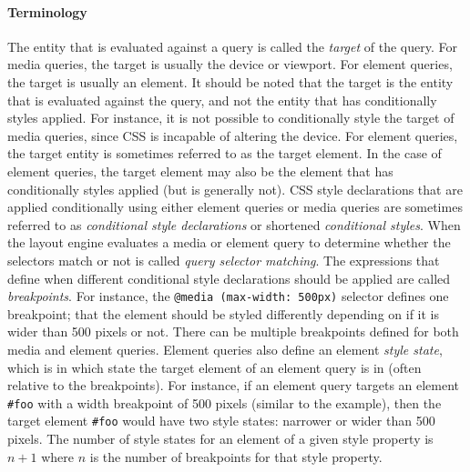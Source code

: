 \documentclass[a4paper,11pt]{kth-mag}
\newcommand{\code}[1]{\texttt{#1}}
\begin{document}
      \paragraph{Terminology}
      The entity that is evaluated against a query is called the \emph{target} of the query.
      For \gls{media queries}, the target is usually the device or \gls{viewport}.
      For element queries, the target is usually an \gls{element}.
      It should be noted that the target is the entity that is evaluated against the query, and not the entity that has conditionally styles applied.
      For instance, it is not possible to conditionally style the target of \gls{media queries}, since \gls{CSS} is incapable of altering the device.
      For element queries, the target entity is sometimes referred to as the target \gls{element}.
      In the case of element queries, the target element may also be the element that has conditionally styles applied (but is generally not).
      \gls{CSS} style declarations that are applied conditionally using either element queries or \gls{media queries} are sometimes referred to as \emph{conditional style declarations} or shortened \emph{conditional styles}.
      When the \gls{layout engine} evaluates a media or element query to determine whether the selectors match or not is called \emph{query selector matching}.
      The expressions that define when different conditional style declarations should be applied are called \emph{breakpoints}.
      For instance, the  \code{@media (max-width: 500px)} selector defines one breakpoint; that the element should be styled differently depending on if it is wider than 500 pixels or not.
      There can be multiple breakpoints defined for both media and element queries.
      Element queries also define an element \emph{style state}, which is in which state the target element of an element query is in (often relative to the breakpoints).
      For instance, if an element query targets an element \code{\#foo} with a width breakpoint of 500 pixels (similar to the  example), then the target element \code{\#foo} would have two style states: narrower or wider than 500 pixels.
      The number of style states for an element of a given style property is $n + 1$ where $n$ is the number of breakpoints for that style property.
\end{document}
